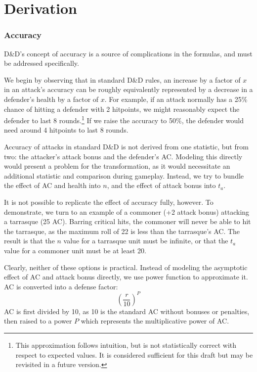 \section{Derivation}

\subsubsection{Accuracy}

D\&D's concept of accuracy is a source of complications in the formulas,
and must be addressed specifically.

We begin by observing that in standard D\&D rules,
an increase by a factor of $x$ in an attack's accuracy
can be roughly equivalently represented by a decrease in a defender's
health by a factor of $x$.
For example, if an attack normally has a 25\% chance of hitting a defender with 2 hitpoints,
we might reasonably expect the defender to last 8 rounds.\footnote{
    This approximation follows intuition,
    but is not statistically correct with respect to expected values.
    It is considered sufficient for this draft
    but may be revisited in a future version.
}
If we raise the accuracy to 50\%,
the defender would need around 4 hitpoints to last 8 rounds.

Accuracy of attacks in standard D\&D is not derived from one statistic,
but from two: the attacker's attack bonus and the defender's AC.
Modeling this directly would present a problem for the transformation,
as it would necessitate an additional statistic and comparison during gameplay.
Instead, we try to bundle the effect of AC and health into $n$,
and the effect of attack bonus into $t_a$.

It is not possible to replicate the effect of accuracy fully, however.
To demonstrate, we turn to an example of a commoner (+2 attack bonus)
attacking a tarrasque (25 AC).
Barring critical hits, the commoner will never be able to hit the tarrasque,
as the maximum roll of 22 is less than the tarrasque's AC.
The result is that the $n$ value for a tarrasque unit must be infinite,
or that the $t_a$ value for a commoner unit must be at least 20.

Clearly, neither of these options is practical.
Instead of modeling the asymptotic effect of AC and attack bonus directly,
we use power function to approximate it.
AC is converted into a defense factor:
\[
    \left(\frac{r}{10}\right)^P
\]
AC is first divided by 10,
as 10 is the standard AC without bonuses or penalties,
then raised to a power $P$ which represents the multiplicative power of AC.

